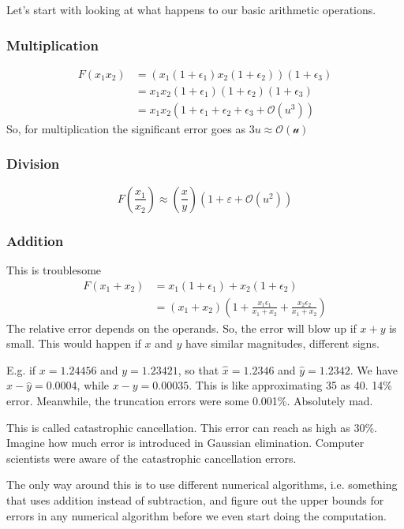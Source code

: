 Let's start with looking at what happens to our basic
arithmetic operations.

\subsubsection*{Multiplication}
\begin{equation}
    \begin{split}
        F(x_1x_2) &= (x_1(1+\epsilon_1)x_2(1 + \epsilon_2))(1 + \epsilon_3)\\
                  &= x_1x_2(1 + \epsilon_1)(1+\epsilon_2)(1+\epsilon_3)\\
                  &= x_1x_2(1 + \epsilon_1 + \epsilon_2
                  + \epsilon_3 + \mathcal{O}(u^3))
    \end{split}
\end{equation}
So, for multiplication the significant error goes as $3u\approx \mathcal{O(u)}$

\subsubsection*{Division}
\begin{equation}
F(\frac{x_1}{x_2}) \approx (\frac{x}{y})(1 + \varepsilon + \mathcal{O}(u^2))
\end{equation}

\subsubsection*{Addition}
This is troublesome
\begin{equation}
    \begin{split}
    F(x_1 + x_2) &= x_1(1 + \epsilon_1) + x_2(1 + \epsilon_2)\\
                 &= (x_1+x_2)(1 + \frac{x_1\epsilon_1}{x_1 + x_2} + \frac{x_2\epsilon_2}{x_1 + x_2})
    \end{split}
\end{equation}
The relative error depends on the operands. So, the error
will blow up if $x + y$ is small. This would happen if
$x$ and $y$ have similar magnitudes, different signs.

E.g. if $x = 1.24456$ and  $y = 1.23421$, so that
 $\hat{x} = 1.2346$ and $\hat{y} = 1.2342$. We have
$\hat{x} - \hat{y} = 0.0004$, while $x - y = 0.00035$.
This is like approximating 35 as 40. 14\% error.
Meanwhile, the truncation errors were some 0.001\%.
Absolutely mad.

This is called catastrophic cancellation.
This error can reach as high as 30\%. Imagine how much
error is introduced in Gaussian elimination. Computer
scientists were aware of the catastrophic cancellation
errors.

The only way around this is to use different numerical
algorithms, i.e. something that uses addition instead of
subtraction, and figure out the upper bounds for errors
in any numerical algorithm before we even start doing
the computation.
